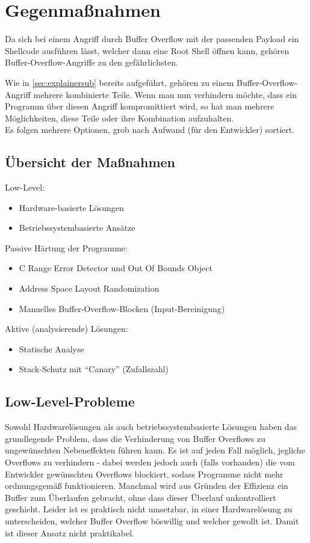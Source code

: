 \pagebreak
\section{Gegenmaßnahmen}
Da sich bei einem Angriff durch Buffer Overflow mit der passenden Payload
ein Shellcode ausführen lässt, welcher dann eine Root Shell
öffnen kann, gehören
Buffer-Overflow-Angriffe zu den gefährlichsten.

Wie in \autoref{sec:explainersub} bereits aufgeführt,
gehören zu einem Buffer-Overflow-Angriff mehrere kombinierte Teile. Wenn
man nun verhindern möchte, dass ein Programm über diesen Angriff kompromittiert wird, 
so hat man mehrere Möglichkeiten, diese Teile oder ihre Kombination aufzuhalten. \cite{Werthmann2006SurveyOB}\\

Es folgen mehrere Optionen, grob nach Aufwand (für den Entwickler) sortiert.
\subsection{Übersicht der Maßnahmen}
Low-Level:
\begin{itemize}
    \item Hardware-basierte Lösungen
    \item Betriebssystembasierte Ansätze
\end{itemize}
Passive Härtung der Programme:
\begin{itemize}
    \item C Range Error Detector und Out Of Bounds Object
    \item Address Space Layout Randomization
    \item Manuelles Buffer-Overflow-Blocken (Input-Bereinigung)
\end{itemize}
Aktive (analysierende) Lösungen:
\begin{itemize}
    \item Statische Analyse
    \item Stack-Schutz mit ``Canary'' (Zufallszahl)
\end{itemize}

\subsection{Low-Level-Probleme}
Sowohl Hardwarelösungen als auch betriebssystembasierte Lösungen haben
das grundlegende Problem, dass die Verhinderung von Buffer Overflows zu
ungewünschten Nebeneffekten führen kann. Es ist auf jeden Fall möglich,
jegliche Overflows zu verhindern - dabei werden jedoch auch (falls vorhanden) die vom
Entwickler gewünschten Overflows blockiert, sodass Programme nicht mehr
ordnungsgemäß funktionieren. Manchmal wird aus Gründen der Effizienz ein
Buffer zum Überlaufen gebracht, ohne dass dieser Überlauf unkontrolliert
geschieht. Leider ist es praktisch nicht umsetzbar, in einer Hardwarelösung
zu unterscheiden, welcher Buffer Overflow böswillig und welcher gewollt ist. 
Damit ist dieser Ansatz nicht praktikabel.
\pagebreak

